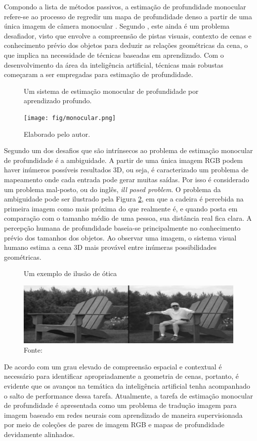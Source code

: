 Compondo a lista de métodos passivos, a estimação de profundidade monocular refere-se ao processo de regredir um mapa de profundidade denso a partir de uma única imagem de câmera monocular \cite{birkl2023midas}. Segundo , este ainda é um problema desafiador, visto que envolve a compreensão de pistas visuais, contexto de cenas e conhecimento prévio dos objetos para deduzir as relações geométricas da cena, o que implica na necessidade de técnicas baseadas em aprendizado. Com o desenvolvimento da área da inteligência artificial, técnicas mais robustas começaram a ser empregadas para estimação de profundidade. 

\begin{figure}[h!]
    \centering
    \caption{Um sistema de estimação monocular de profundidade por aprendizado profundo.}
    \texttt{[image: fig/monocular.png]}
    \caption*{Elaborado pelo autor.}
    \label{fig:monoestim}
\end{figure}

Segundo  um dos desafios que são intrínsecos ao problema de estimação monocular de profundidade é a ambiguidade. A partir de uma única imagem RGB podem haver inúmeros possíveis resultados 3D, ou seja, é caracterizado um problema de mapeamento onde cada entrada pode gerar muitas saídas. Por isso é considerado um problema mal-posto, ou do inglês, \textit{ill posed problem}. O problema da ambiguidade pode ser ilustrado pela Figura \ref{fig:ambiguity}, em que a cadeira é percebida na primeira imagem como mais próxima do que realmente é, e quando posta em comparação com o tamanho médio de uma pessoa, sua distância real fica clara. A percepção humana de profundidade baseia-se principalmente no conhecimento prévio dos tamanhos dos objetos. Ao observar uma imagem, o sistema visual humano estima a cena 3D mais provável entre inúmeras possibilidades geométricas. 


\begin{figure}[h!]
    \centering
    \caption{Um exemplo de ilusão de ótica}
    \includegraphics[width=.9\textwidth]{fig/ambiguity.png}
    \caption*{Fonte: }
    \label{fig:ambiguity}
\end{figure}


De acordo com  um grau elevado de compreensão espacial e contextual é necessário para identificar apropriadamente a geometria de cenas, portanto, é evidente que os avanços na temática da inteligência artificial tenha acompanhado o salto de performance dessa tarefa. Atualmente, a tarefa de estimação monocular de profundidade é apresentada como um problema de tradução imagem para imagem baseado em redes neurais com aprendizado de maneira supervisionada por meio de coleções de pares de imagem RGB e mapas de profundidade devidamente alinhados.  
